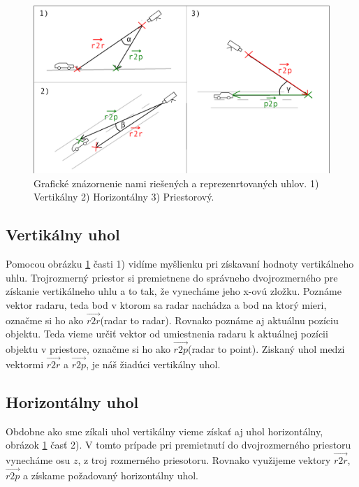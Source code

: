     \begin{figure}[h]
        \centering
        \includegraphics[width=1.0\textwidth]{obrazky-figures/radar_angles.png}
        \caption{Grafické znázornenie nami riešených a reprezenrtovaných uhlov. 1) Vertikálny 2) Horizontálny 3) Priestorový.}
        \label{fig:radar_angles}
    \end{figure}  

    \subsection{Vertikálny uhol}

      \hspace{0.6cm}Pomocou obrázku \ref{fig:radar_angles} časti 1) vidíme myšlienku pri získavaní hodnoty vertikálneho uhlu. Trojrozmerný priestor si premietnene do správneho dvojrozmerného pre získanie vertikálneho uhlu a to tak, že vynecháme jeho x-ovú zložku.
      Poznáme vektor radaru, teda bod v ktorom sa radar nachádza a bod na ktorý mieri, označme si ho ako $\overrightarrow{r2r}$(radar to radar).
      Rovnako poznáme aj aktuálnu pozíciu objektu. Teda vieme určiť vektor od umiestnenia radaru k aktuálnej pozícii objektu v priestore, označme si ho ako $\overrightarrow{r2p}$(radar to point).
      Ziskaný uhol medzi vektormi $\overrightarrow{r2r}$ a $\overrightarrow{r2p}$, je náš žiadúci vertikálny uhol. 

    \subsection{Horizontálny uhol}

      \hspace{0.6cm}Obdobne ako sme zíkali uhol vertikálny vieme získať aj uhol horizontálny, obrázok \ref{fig:radar_angles} časť 2). V tomto prípade pri premietnutí do dvojrozmerného priestoru vynecháme osu $z$, z troj rozmerného priesotoru.
      Rovnako využijeme vektory $\overrightarrow{r2r}$, $\overrightarrow{r2p}$ a získame požadovaný horizontálny uhol.
    \newline

